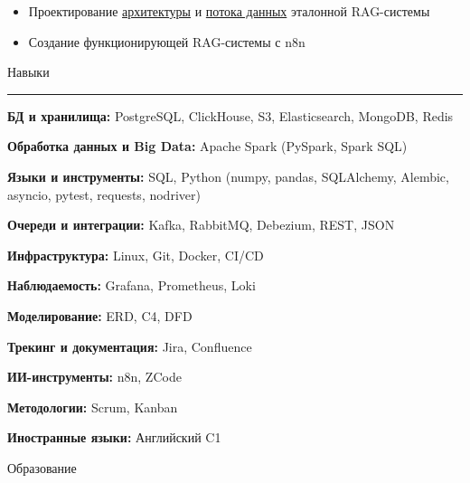 \documentclass[14pt, a4paper, oneside]{extarticle}
\begin{document}

\begin{itemize}
	\vspace{-2\intextsep}
	\item Проектирование \href{https://github.com/Crazy5202/job_application_form/tree/main/portfolio/K2/RAG_C4.pdf}{архитектуры} и \href{https://github.com/Crazy5202/job_application_form/tree/main/portfolio/K2/RAG_DFD.pdf}{потока данных} эталонной RAG-системы
	\vspace{-0.8\intextsep}
    \item Создание функционирующей RAG-системы с n8n
\end{itemize}

\pagebreak


\begin{flushleft}
	\vspace{-\intextsep}
	\large Навыки
\end{flushleft}

\vspace{-0.8\intextsep}
\hrule


\vspace{0.5\intextsep}

\textbf{БД и хранилища:} PostgreSQL, ClickHouse, S3, Elasticsearch, MongoDB, Redis

\textbf{Обработка данных и Big Data:} Apache Spark (PySpark, Spark SQL)

\textbf{Языки и инструменты:} SQL, Python (numpy, pandas, SQLAlchemy, Alembic, asyncio, pytest, requests, nodriver)

\textbf{Очереди и интеграции:} Kafka, RabbitMQ, Debezium, REST, JSON

\textbf{Инфраструктура:} Linux, Git, Docker, CI/CD

\textbf{Наблюдаемость:} Grafana, Prometheus, Loki

\textbf{Моделирование:} ERD, C4, DFD

\textbf{Трекинг и документация:} Jira, Confluence

\textbf{ИИ-инструменты:} n8n, ZCode 

\textbf{Методологии:} Scrum, Kanban

\textbf{Иностранные языки:} Английский C1


\begin{flushleft}
	\vspace{-\intextsep}
	\large Образование
\end{flushleft}
\end{document}
